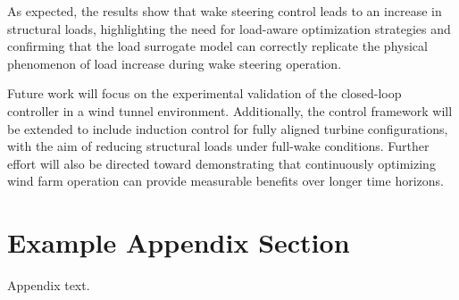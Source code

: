 \documentclass[final,5p,times,twocolumn]{elsarticle}
\begin{document}
As expected, the results show that wake steering control leads to an increase in structural loads, highlighting the need for load-aware optimization strategies and confirming that the load surrogate model can correctly replicate the physical phenomenon of load increase during wake steering operation.

Future work will focus on the experimental validation of the closed-loop controller in a wind tunnel environment. Additionally, the control framework will be extended to include induction control for fully aligned turbine configurations, with the aim of reducing structural loads under full-wake conditions. Further effort will also be directed toward demonstrating that continuously optimizing wind farm operation can provide measurable benefits over longer time horizons.


\appendix
\section{Example Appendix Section}
\label{app1}

Appendix text.

 

\end{document}
